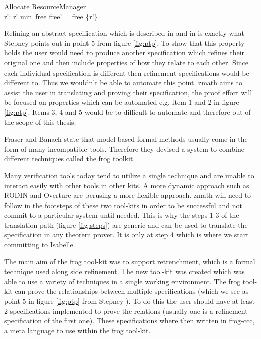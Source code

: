 \begin{exam}

\begin{schema}{Allocate}
\Delta ResourceManager \\
r!: \nat
\where
r! \in min~free \land free' = free \setminus \{r!\}
\end{schema}
\label{exam:allocaterefine} 
\end{exam}

Refining an abstract specification which is described in
\cite{Woodcock:1996:UZS:235337} and in \cite{spiveyreferencemanual} is exactly
what Stepney points out in point 5 from figure \ref{fig:ptp}. To show that this
property holds the user would need to produce another specification which
refines their original one and then include properties of how they relate to
each other. Since each individual specification is different then refinement
specifications would be different to. Thus we wouldn't be able to automate this
point. \gls{zmath} aims to assist the user in translating and proving their
specification, the proof effort will be focused on properties which can be
automated e.g. item 1 and 2 in figure \ref{fig:ptp}. Items 3, 4 and 5 would be to
difficult to automate and therefore out of the scope of this thesis.

Fraser and Banach \cite{DBLP:conf/sefm/FraserB07} state that model based formal
methods usually come in the form of many incompatible tools. Therefore they
devised a system to combine different techniques called the frog toolkit.

Many verification tools today tend to utilize a single technique and are unable
to interact easily with other tools in other kits. A more dynamic approach such
as RODIN \cite{Jones05j} and Overture \cite{overture} are perusing a more
flexible approach. \gls{zmath} will need to follow in the footsteps of these two
tool-kits in order to be successful and not commit to a particular system until
needed. This is why the steps 1-3 of the translation path (figure
\ref{fig:steps}) are generic and can be used to translate the specification in
any theorem prover. It is only at step 4 which is where we start committing to
Isabelle.

The main aim of the frog tool-kit was to support retrenchment, which is a formal
technique used along side refinement. The new tool-kit was created which was
able to use a variety of techniques in a single working environment. The frog
tool-kit can prove the relationships between multiple specifications (which we
see as point 5 in figure \ref{fig:ptp} from Stepney \cite{stepney1998tale}). To
do this the user should have at least 2 specifications implemented to prove the
relations (usually one is a refinement specification of the first one). These
specifications where then written in frog-ccc, a meta language to use within the
frog tool-kit.

